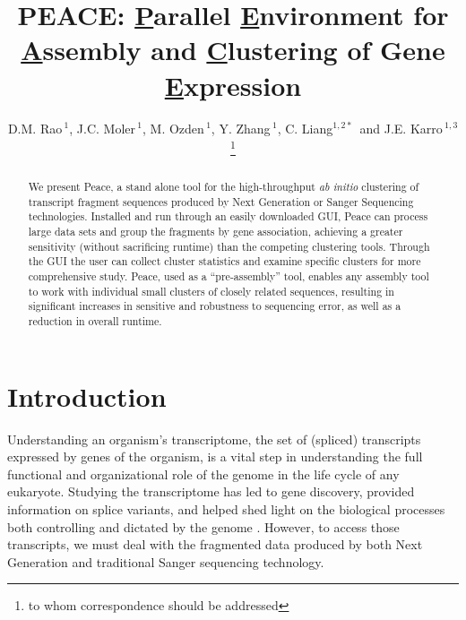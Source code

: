 \documentclass[a4,center,fleqn]{NAR}
\begin{document}
\title{PEACE: {\underline P}arallel {\underline E}nvironment for {\underline A}ssembly
  and {\underline C}lustering of Gene {\underline E}xpression}

\author{D.M. Rao\,$^{1}$, J.C. Moler\,$^{1}$, M. Ozden\,$^1$, Y. Zhang\,$^{1}$,
  C. Liang$^{1,2*}$\, and J.E. Karro\,$^{1,3}$\footnote{to whom
    correspondence should be addressed}}

\address{$^1$ Department of Computer Science and Software Engineering, \\
  $^2$ Department of Botany, \\
  $^3$ and Department of Microbiology, Miami University, Oxford, Ohio,
  USA}




\maketitle

\begin{abstract}
  We present {\sc Peace}, a stand alone tool for the high-throughput
  {\it ab initio} clustering of transcript fragment sequences produced
  by Next Generation or Sanger Sequencing technologies.  Installed and
  run through an easily downloaded GUI, {\sc Peace} can process large
  data sets and group the fragments by gene association, achieving a
  greater sensitivity (without sacrificing runtime) than the competing
  clustering tools.  Through the GUI the user can collect
  cluster statistics and examine specific clusters for more
  comprehensive study.  {\sc Peace}, used as a ``pre-assembly'' tool,
  enables any assembly tool to work with individual small clusters of
  closely related sequences, resulting in significant increases in
  sensitive and robustness to sequencing error, as well as a reduction in
  overall runtime.
\end{abstract}


\section{Introduction}

Understanding an organism's transcriptome, the set of (spliced)
transcripts expressed by genes of the organism, is a vital step in
understanding the full functional and organizational role of the
genome in the life cycle of any eukaryote.  Studying the transcriptome
has led to gene discovery, provided information on splice variants,  
and helped shed light on the biological processes both controlling and
dictated by the genome \cite{Nagaraj07}.  However, to access those
transcripts, we must deal with the fragmented data produced by
both Next Generation and traditional Sanger sequencing technology.
\end{document}
